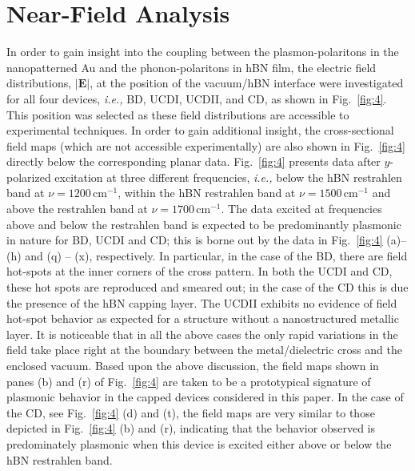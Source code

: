 \documentclass[preprint,
amsmath,amssymb,
aip,
jap,
floatfix,]{revtex4-2}
\begin{document}
		\section{Near-Field Analysis}
		\label{sec:NFA}
				In order to gain insight into the coupling between the plasmon-polaritons in the nanopatterned Au and the phonon-polaritons in hBN film, the electric field distributions, $|\bm{E}|$, at the position of the vacuum/hBN interface were investigated for all four devices,  \textit{i.e.,} BD, UCDI, UCDII, and CD, as shown in Fig.~\ref{fig:4}. This position was selected as these field distributions are accessible to experimental techniques. In order to gain additional insight, the cross-sectional field maps (which are not accessible experimentally) are also shown in Fig.~\ref{fig:4} directly below the corresponding planar data. Fig.~\ref{fig:4} presents data after $y$-polarized excitation at three different frequencies, \textit{i.e.,} below the hBN restrahlen band at $\nu = 1200 \, \mathrm{cm}^{-1}$, within the hBN restrahlen band at $\nu = 1500 \, \mathrm{cm}^{-1}$ and above the restrahlen band at $\nu = 1700 \, \mathrm{cm}^{-1}$. The data excited at frequencies above and below the restrahlen band is expected to be predominantly plasmonic in nature for   BD, UCDI and CD; this is borne out by the data in Fig.~\ref{fig:4} (a)--(h) and (q) -- (x), respectively. In particular, in the case of the BD, there are field hot-spots at the inner corners of the cross pattern. In both the UCDI and CD, these hot spots are reproduced and smeared out; in the case of the CD this is due the presence of the  hBN capping layer. The UCDII exhibits no evidence of field hot-spot behavior as expected for a structure without a nanostructured metallic layer. It is noticeable that in all the above cases the only rapid variations in the field take place right at the boundary between the metal/dielectric cross and the enclosed vacuum. Based upon the above discussion, the field maps shown in panes (b) and (r) of Fig.~\ref{fig:4} are taken to be a prototypical signature of plasmonic behavior in the capped devices considered in this paper. In the case of the CD, see Fig.~\ref{fig:4} (d) and (t), the field maps are very similar to those depicted in Fig.~\ref{fig:4} (b) and (r), indicating that the behavior observed is predominately plasmonic when this device is excited either above or below the hBN restrahlen band.
\end{document}
